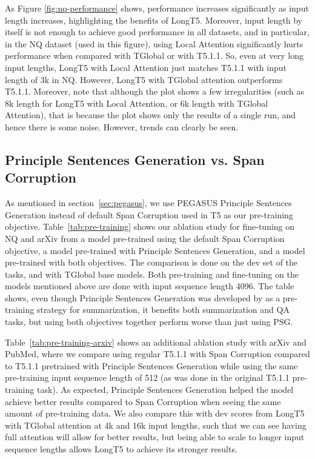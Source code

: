 As Figure \ref{fig:nq-performance} shows, performance increases significantly as input length increases, highlighting the benefits of LongT5. Moreover, input length by itself is not enough to achieve good performance in all datasets, and in particular, in the NQ dataset (used in this figure), using Local Attention significantly hurts performance when compared with TGlobal or with T5.1.1. So, even at very long input lengths, LongT5 with Local Attention just matches T5.1.1 with input length of 3k in NQ. However, LongT5 with TGlobal attention outperforms T5.1.1. Moreover, note that although the plot shows a few irregularities (such as 8k length for LongT5 with Local Attention, or 6k length with TGlobal Attention), that is because the plot shows only the results of a single run, and hence there is some noise. However, trends can clearly be seen.

\subsection{Principle Sentences Generation vs. Span Corruption} \label{subsec:analysis:pegasus_vs_span}
As mentioned in section~\ref{sec:pegasus}, we use PEGASUS Principle Sentences Generation instead of default Span Corruption used in T5 as our pre-training objective.
Table~\ref{tab:pre-training} shows our ablation study for fine-tuning on NQ and arXiv from a model pre-trained using the default Span Corruption objective, a model pre-trained with Principle Sentences Generation, and a model pre-trained with both objectives. The comparison is done on the dev set of the tasks, and with TGlobal base models. Both pre-training and fine-tuning on the models mentioned above are done with input sequence length 4096. The table shows, even though Principle Sentences Generation was developed by \citet{pegasus} as a pre-training strategy for summarization, it benefits both summarization and QA tasks, but using both objectives together perform worse than just using PSG.

Table~\ref{tab:pre-training-arxiv} shows an additional ablation study with arXiv and PubMed, where we compare using regular T5.1.1 with Span Corruption compared to T5.1.1 pretrained with Principle Sentences Generation while using the same pre-training input sequence length of 512 (as was done in the original T5.1.1 pre-training task). As expected, Principle Sentences Generation helped the model achieve better results compared to Span Corruption when seeing the same amount of pre-training data. We also compare this with dev scores from LongT5 with TGlobal attention at 4k and 16k input lengths, such that we can see having full attention will allow for better results, but being able to scale to longer input sequence lengths allows LongT5 to achieve its stronger results.

